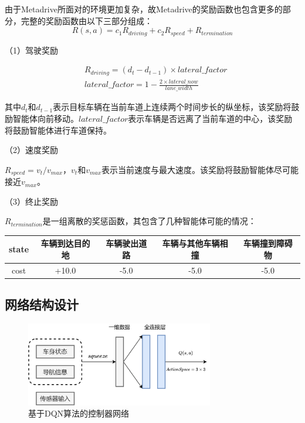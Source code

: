 由于Metadrive所面对的环境更加复杂，故Metadrive的奖励函数也包含更多的部分，完整的奖励函数由以下三部分组成：
\begin{equation}
    R(s,a) = c_1 R_{driving} + c_2 R_{speed} + R_{termination}
\end{equation}

（1）驾驶奖励

\begin{equation*}
    \begin{aligned}
        &R_{driving} = (d_t - d_{t-1}) \times lateral\_factor\\
        &lateral\_factor = 1 - \frac{2\times lateral\_now }{lane\_width}
    \end{aligned}
\end{equation*}

其中$d_t$和$d_{t-1}$表示目标车辆在当前车道上连续两个时间步长的纵坐标，该奖励将鼓励智能体向前移动。$lateral\_factor$表示车辆是否远离了当前车道的中心，该奖励将鼓励智能体进行车道保持。

（2）速度奖励

$R_{speed} = v_t / v_{max}$，$v_t$和$v_{max}$表示当前速度与最大速度。该奖励将鼓励智能体尽可能接近$v_{max}$。

（3）终止奖励

$R_{termination}$是一组离散的奖惩函数，其包含了几种智能体可能的情况：
\begin{table}[htbp]
    \vspace{13pt}
    \centering
    \renewcommand\arraystretch{1.5}
    \begin{tabular}{|c|c|c|c|c|}
    \hline
    state & 车辆到达目的地 & 车辆驶出道路 & 车辆与其他车辆相撞 & 车辆撞到障碍物 \\ \hline
    cost  & +10.0   & -5.0   & -5.0      & -5.0    \\ \hline
    \end{tabular}
\end{table}

\subsection{网络结构设计} %

\begin{figure}[htbp]
    \vspace{13pt}
    \centering
    \includegraphics[width=0.73\textwidth]{images/chapter3/metadrive_control.png}
    \caption{基于DQN算法的控制器网络}\label{DQN算法的控制器网络} %
\end{figure}  

